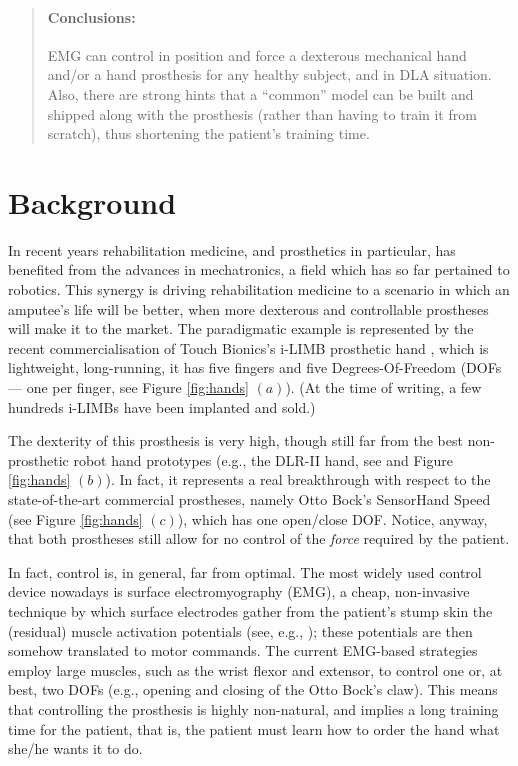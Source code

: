 \documentclass[10pt]{bmc_article}
\newenvironment{bmcformat}{\begin{raggedright}\baselineskip20pt\sloppy\setboolean{publ}{false}}{\end{raggedright}\baselineskip20pt\sloppy}
\begin{document}
\begin{bmcformat}
\begin{abstract}
\paragraph*{Conclusions:}
EMG can control in position and force a dexterous mechanical hand and/or a hand prosthesis for any healthy subject, and in DLA situation. Also, there are strong hints that a ``common'' model can be built and shipped along with the prosthesis (rather than having to train it from
scratch), thus shortening the patient's training time.

\end{abstract}


\section*{Background}
\label{sec:introduction}

In recent years rehabilitation medicine, and prosthetics in
particular, has benefited from the advances in mechatronics, a field
which has so far pertained to robotics. This synergy is driving
rehabilitation medicine to a scenario in which an amputee's life will
be better, when more dexterous and controllable prostheses will make
it to the market. The paradigmatic example is represented by the
recent commercialisation of Touch Bionics's i-LIMB prosthetic hand
\cite{ilimb}, which is lightweight, long-running, it has five fingers
and five Degrees-Of-Freedom (DOFs --- one per finger, see Figure
\ref{fig:hands} $(a)$). (At the time of writing, a few hundreds i-LIMBs
have been implanted and sold.)

The dexterity of this prosthesis is very high, though still far from
the best non-prosthetic robot hand prototypes (e.g., the DLR-II hand,
see \cite{Hua2006} and Figure \ref{fig:hands} $(b)$). In fact, it
represents a real breakthrough with respect to the state-of-the-art
commercial prostheses, namely Otto Bock's SensorHand Speed (see Figure
\ref{fig:hands} $(c)$), which has one open/close DOF. Notice, anyway,
that both prostheses still allow for no control of the \emph{force}
required by the patient.

In fact, control is, in general, far from optimal. The most widely
used control device nowadays is surface electromyography (EMG), a
cheap, non-invasive technique by which surface electrodes gather from
the patient's stump skin the (residual) muscle activation potentials
(see, e.g., \cite{deluca}); these potentials are then somehow
translated to motor commands. The current EMG-based strategies employ
large muscles, such as the wrist flexor and extensor, to control one
or, at best, two DOFs (e.g., opening and closing of the Otto Bock's
claw). This means that controlling the prosthesis is highly
non-natural, and implies a long training time for the patient, that
is, the patient must learn how to order the hand what she/he wants it
to do.


\end{bmcformat}
\end{document}
